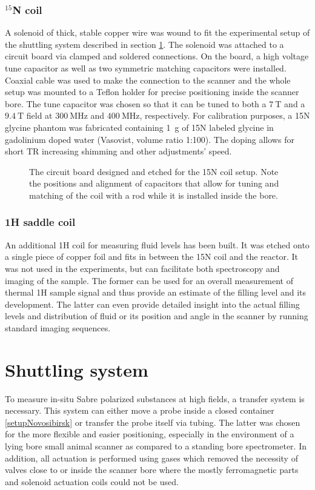             \subsubsection{$^{15}$N coil}
            \label{sec:matMeth:15Ncoil}
                A solenoid of thick, stable copper wire was wound to fit the experimental setup of the shuttling system described in section \ref{sec:shuttlingSystem}. The solenoid was attached to a circuit board via clamped and soldered connections. On the board, a high voltage tune capacitor as well as two symmetric matching capacitors were installed. Coaxial cable was used to make the connection to the scanner and the whole setup was mounted to a Teflon holder for precise positioning inside the scanner bore. The tune capacitor was chosen so that it can be tuned to both a $\SI{7}{\tesla}$ and a $\SI{9.4}{\tesla}$ field at $\SI{300}{\MHz}$ and $\SI{400}{\MHz}$, respectively.
                For calibration purposes, a 15N glycine phantom was fabricated containing \SI{1}{\gram} of 15N labeled glycine in gadolinium  doped water (Vasovist, volume ratio 1:100). The doping allows for short TR increasing shimming and other adjustments' speed.
                \begin{figure}
                    \label{figure:matMeth:15NcircuitBoard}
                    \caption[15N circuit board]{The circuit board designed and etched for the 15N coil setup. Note the positions and alignment of capacitors that allow for tuning and matching of the coil with a rod while it is installed inside the bore.}
                \end{figure}
            \subsubsection{1H saddle coil} 
            An additional 1H coil for measuring fluid levels has been built. It was etched onto a single piece of copper foil and fits in between the 15N coil and the reactor. It was not used in the experiments, but can facilitate both spectroscopy and imaging of the sample. The former can be used for an overall measurement of thermal 1H sample signal and thus provide an estimate of the filling level and its development. The latter can even provide detailed insight into the actual filling levels and distribution of fluid or its position and angle in the scanner by running standard imaging sequences.
    \section{Shuttling system}\label{sec:shuttlingSystem}
    To measure in-situ Sabre polarized substances at high fields, a transfer system is necessary. This system can either move a probe inside a closed container \ref{setupNovosibirsk} or transfer the probe itself via tubing. The latter was chosen for the more flexible and easier positioning, especially in the environment of a lying bore small animal scanner as compared to a standing bore spectrometer. In addition, all actuation is performed using gases which removed the necessity of valves close to or inside the scanner bore where the mostly ferromagnetic parts and solenoid actuation coils could not be used.


